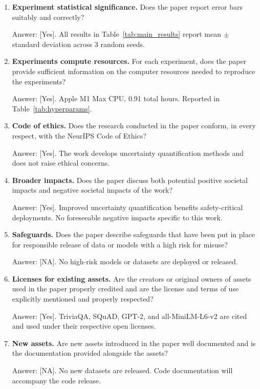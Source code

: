 \documentclass{article}
\begin{document}
\begin{enumerate}
\item \textbf{Experiment statistical significance.} Does the paper report error bars suitably and correctly?

Answer: [Yes]. All results in Table~\ref{tab:main_results} report mean $\pm$ standard deviation across 3 random seeds.

\item \textbf{Experiments compute resources.} For each experiment, does the paper provide sufficient information on the computer resources needed to reproduce the experiments?

Answer: [Yes]. Apple M1 Max CPU, 0.91 total hours. Reported in Table~\ref{tab:hyperparams}.

\item \textbf{Code of ethics.} Does the research conducted in the paper conform, in every respect, with the NeurIPS Code of Ethics?

Answer: [Yes]. The work develops uncertainty quantification methods and does not raise ethical concerns.

\item \textbf{Broader impacts.} Does the paper discuss both potential positive societal impacts and negative societal impacts of the work?

Answer: [Yes]. Improved uncertainty quantification benefits safety-critical deployments. No foreseeable negative impacts specific to this work.

\item \textbf{Safeguards.} Does the paper describe safeguards that have been put in place for responsible release of data or models with a high risk for misuse?

Answer: [NA]. No high-risk models or datasets are deployed or released.

\item \textbf{Licenses for existing assets.} Are the creators or original owners of assets used in the paper properly credited and are the license and terms of use explicitly mentioned and properly respected?

Answer: [Yes]. TriviaQA, SQuAD, GPT-2, and all-MiniLM-L6-v2 are cited and used under their respective open licenses.

\item \textbf{New assets.} Are new assets introduced in the paper well documented and is the documentation provided alongside the assets?

Answer: [NA]. No new datasets are released. Code documentation will accompany the code release.


\end{enumerate}
\end{document}
